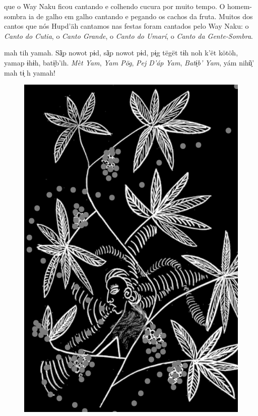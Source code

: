 \mbox{}\vspace*{\fill}

 que o Way Naku ficou
cantando e colhendo cucura
por muito tempo. O homem-sombra
ia de galho em galho
cantando e pegando os cachos
da fruta. Muitos dos cantos
que nós Hupd’äh cantamos nas
festas foram cantados pelo Way
Naku: o \textit{Canto do Cutia}, o \textit{Canto
Grande}, o \textit{Canto do Umarí}, o
\textit{Canto da Gente-Sombra}.

\vspace{2em}

 mah tih yamah. Sã̗p nowot
pɨd, sã̗p nowot pɨd, pɨ̗g tëgët
tɨh noh k’ët kötöh, yamap ɨhɨh,
batɨ̗b’ih. \textit{Mèt Yam}, \textit{Yam Pög}, \textit{Pej
D’áp Yam}, \textit{Batɨ̗b’ Yam}, yám nihũ̗’
mah tɨ̗ h yamah!

\vspace*{\fill}

\begin{figure}
\vspace*{-2cm}
\hspace*{-2.4cm}\includegraphics[width=142mm]{./imgs/img3.jpg}
\end{figure}

